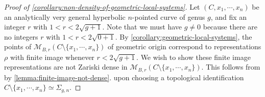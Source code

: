 \begin{proof}[Proof of \autoref{corollary:non-density-of-geometric-local-systems}]
Let $(C, x_1, \cdots, x_n)$ be an analytically very general hyperbolic
$n$-pointed curve of genus $g$, and fix an integer $r$ with $1<r<2\sqrt{g+1}$.
Note that we must have $g \neq 0$ because there are no integers $r$ with $1 < r
< 2 \sqrt{0 + 1}$.
By \autoref{corollary:geometric-local-systems}, the points of
$\mathscr{M}_{B,r}(C\setminus\{x_1, \cdots, x_n\})$ of geometric origin
correspond to representations $\rho$ with finite image whenever $r < 2
\sqrt{g+1}$.
We wish to show these finite image representations are not Zariski dense in
$\mathscr{M}_{B,r}(C\setminus\{x_1, \cdots, x_n\})$.
This follows from
by \autoref{lemma:finite-image-not-dense}.
upon choosing a topological identification $C\setminus\{x_1, \cdots, x_n\} \simeq
\Sigma_{g,n}$.
\end{proof}

